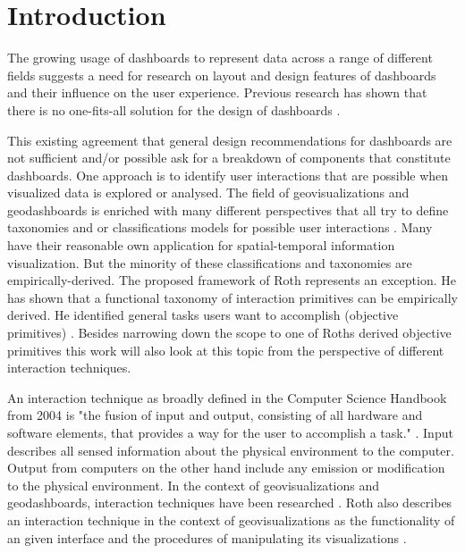 \chapter{Introduction}
The growing usage of dashboards to represent data across a range of different 
fields suggests a need for research on layout and design features of dashboards 
and their influence on the user experience. Previous research has shown that there is
no one-fits-all solution for the design of dashboards \citep*{Yigitbasioglu.2012,Sarikaya.2018}.

This existing agreement that general design recommendations for dashboards are not sufficient
and/or possible ask for a breakdown of components that constitute dashboards. One approach is
to identify user interactions that are possible when visualized data is explored or analysed.
The field of geovisualizations and geodashboards is enriched with many different perspectives that
all try to define taxonomies and or classifications models for possible user interactions
\citep*{Andrienko.2003,Crampton.2002}. Many have their reasonable own application for
spatial-temporal information visualization. But the minority of these classifications and
taxonomies are empirically-derived. The proposed framework of Roth represents an exception.
He has shown that a functional taxonomy of interaction primitives can be empirically derived.
He identified general tasks users want to accomplish (objective primitives) \citep{Roth.2013}.
Besides narrowing down the scope to one of Roths derived objective primitives this work will also
look at this topic from the perspective of different interaction techniques.

An interaction technique as broadly defined in the Computer Science Handbook from 2004
is "the fusion of input and output, consisting of all hardware and software elements, 
that provides a way for the user to accomplish a task." \citep*{Hinckley.2004}. Input describes
all sensed information about the physical environment to the computer. Output from computers on the
other hand include any emission or modification to the physical environment. In the
context of geovisualizations and geodashboards, interaction techniques have been
researched \citep*{Keim.2005,Lobo.2015,vanTonder.2011}.
Roth also describes an interaction technique in the context of geovisualizations as the
functionality of an given interface and the procedures of manipulating its
visualizations \citep{Roth.2013}.

